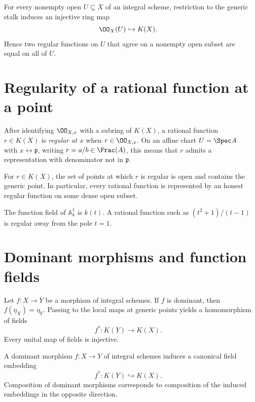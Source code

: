 \begin{proposition}\label{prop:vi27-sections-embed}
For every nonempty open $U\subseteq X$ of an integral scheme, restriction to the generic stalk induces an
injective ring map
\[
\OO_X(U)\hookrightarrow K(X).
\]
Hence two regular functions on $U$ that agree on a nonempty open subset are equal on all of $U$.
\end{proposition}



\section{Regularity of a rational function at a point}
After identifying $\OO_{X,x}$ with a subring of $K(X)$, a rational function $r\in K(X)$ is \emph{regular at $x$}
when $r\in\OO_{X,x}$.  On an affine chart $U=\Spec A$ with $x\leftrightarrow\mathfrak p$, writing
$r=a/b\in\Frac(A)$, this means that $r$ admits a representation with denominator not in $\mathfrak p$.

\begin{proposition}\label{prop:vi27-regular-locus}
For $r\in K(X)$, the set of points at which $r$ is regular is open and contains the generic point.  In particular,
every rational function is represented by an honest regular function on some dense open subset.
\end{proposition}



\begin{example}\label{ex:vi27-expand-02}
The function field of $\mathbb A^1_k$ is $k(t)$.  A rational function such as $(t^2+1)/(t-1)$ is regular away from the pole $t=1$.
\end{example}
\section{Dominant morphisms and function fields}
Let $f:X\to Y$ be a morphism of integral schemes.  If $f$ is dominant, then $f(\eta_X)=\eta_Y$.  Passing to the
local maps at generic points yields a homomorphism of fields
\[
f^*:K(Y)\longrightarrow K(X).
\]
Every unital map of fields is injective.

\begin{theorem}\label{thm:vi27-dominant-field-map}
A dominant morphism $f:X\to Y$ of integral schemes induces a canonical field embedding
\[
f^*:K(Y)\hookrightarrow K(X).
\]
Composition of dominant morphisms corresponds to composition of the induced embeddings in the opposite direction.
\end{theorem}

